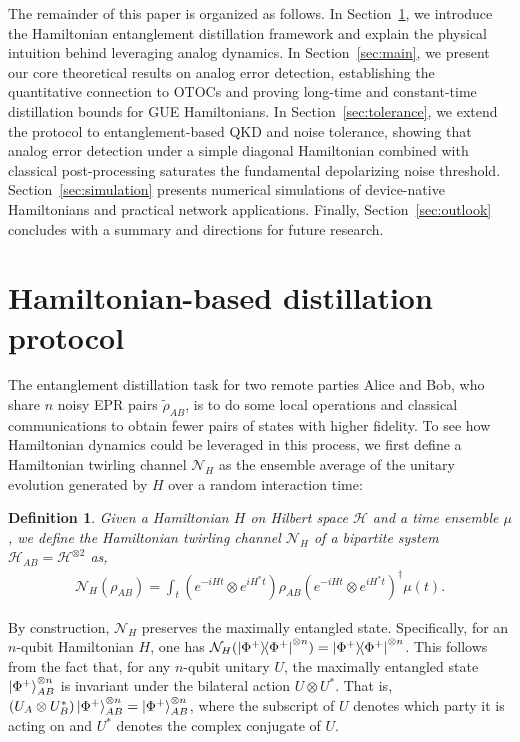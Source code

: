 \documentclass[onecolumn,prx,longbibliography,nofootinbib, superscriptaddress]{revtex4-2}
\newtheorem{definition}{Definition}
\theoremstyle{recap}
\begin{document}
The remainder of this paper is organized as follows. In Section~\ref{sec:protocol}, we introduce the Hamiltonian entanglement distillation framework and explain the physical intuition behind leveraging analog dynamics. In Section~\ref{sec:main}, we present our core theoretical results on analog error detection, establishing the quantitative connection to OTOCs and proving long-time and constant-time distillation bounds for GUE Hamiltonians. In Section~\ref{sec:tolerance}, we extend the protocol to entanglement-based QKD and noise tolerance, showing that analog error detection under a simple diagonal Hamiltonian combined with classical post-processing saturates the fundamental depolarizing noise threshold. Section~\ref{sec:simulation} presents numerical simulations of device-native Hamiltonians and practical network applications. Finally, Section~\ref{sec:outlook} concludes with a summary and directions for future research.

\section{Hamiltonian-based distillation protocol}\label{sec:protocol}
The entanglement distillation task for two remote parties Alice and Bob, who share $n$ noisy EPR pairs $\tilde{\rho}_{AB}$, is to do some local operations and classical communications to obtain fewer pairs of states with higher fidelity. To see how Hamiltonian dynamics could be leveraged in this process, we first define a Hamiltonian twirling channel $\mathcal{N}_H$ as the ensemble average of the unitary evolution generated by $H$ over a random interaction time: 
\begin{definition}
Given a Hamiltonian $H$ on Hilbert space $\mathcal{H}$ and a time ensemble $\mu$, we define the Hamiltonian twirling channel $\mathcal{N}_{H}$ of a bipartite system  $\mathcal{H}_{AB}=\mathcal{H}^{\otimes 2}$ as,
\begin{equation}\label{eq:twirling}
\begin{split}
    \mathcal{N}_{H}(\rho_{AB})=\int_{t}(e^{-iHt}\otimes e^{iH^*t})\rho_{AB} (e^{-iHt}\otimes e^{iH^*t})^{\dagger}\mu(t).
\end{split}
\end{equation}
\end{definition}
By construction, $\mathcal{N}_{H}$ preserves the maximally entangled state. Specifically, for an $n$-qubit Hamiltonian $H$, one has $\mathcal{N}_{H}(\ketbra{\Phi^+}{\Phi^+}^{\otimes n})=\ketbra{\Phi^+}{\Phi^+}^{\otimes n}$. This follows from the fact that, for any $n$-qubit unitary $U$, the maximally entangled state $\ket{\Phi^+}_{AB}^{\otimes n}$ is invariant under the bilateral action $U \otimes U^*$. That is, $(U_A \otimes U_B^*)\ket{\Phi^+}^{\otimes n}_{AB} = \ket{\Phi^+}^{\otimes n}_{AB}$, where the subscript of $U$ denotes which party it is acting on and $U^*$ denotes the complex conjugate of $U$.
\end{document}
